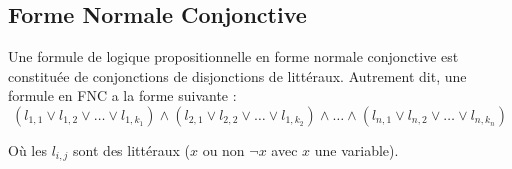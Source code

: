 \begin{appendix}
\subsection{Forme Normale Conjonctive}
\label{def:forme_normale_conjonctive}
Une formule de logique propositionnelle en forme normale conjonctive est constituée de conjonctions de disjonctions de littéraux.
Autrement dit, une formule en FNC a la forme suivante :
$$(l_{1,1} \vee l_{1,2} \vee \ldots \vee l_{1,k_1}) \wedge (l_{2,1} \vee l_{2,2} \vee \ldots \vee l_{1,k_2}) \wedge \ldots \wedge (l_{n,1} \vee l_{n,2} \vee \ldots \vee l_{n,k_n})$$

Où les $l_{i, j}$ sont des littéraux ($x$ ou non $\neg x$ avec $x$ une variable).

\end{appendix}